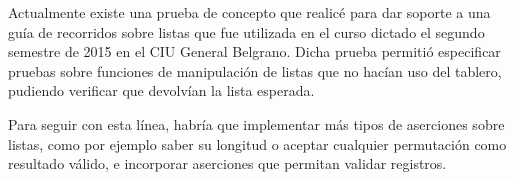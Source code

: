 Actualmente existe una prueba de concepto que realicé para dar soporte a una guía de recorridos sobre listas que fue utilizada en el curso dictado el segundo semestre de 2015 en el CIU General Belgrano. Dicha prueba permitió especificar pruebas sobre funciones de manipulación de listas que no hacían uso del tablero, pudiendo verificar que devolvían la lista esperada.

Para seguir con esta línea, habría que implementar más tipos de aserciones sobre listas, como por ejemplo saber su longitud o aceptar cualquier permutación como resultado válido, e incorporar aserciones que permitan validar registros.
